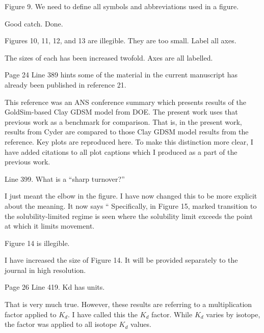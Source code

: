 \documentclass[answers,12pt]{exam}
\begin{document}
\begin{questions}
 

\question Figure 9. We need to define all symbols and abbreviations used in a figure.
\begin{solution}
Good catch. Done.
\end{solution}

 

\question Figures 10, 11, 12, and 13 are illegible. They are too small. Label all axes.
\begin{solution}
The sizes of each has been increased twofold. Axes are all labelled. 
\end{solution}

\question Page 24 Line 389 hints some of the material in the current manuscript has already been published in reference 21.
\begin{solution}
        This reference was an ANS conference summary which presents results of 
        the GoldSim-based Clay GDSM model from DOE. The present work uses that 
        previous work as a benchmark for comparison. That is, in the present 
        work, results from Cyder are compared to those Clay GDSM model results 
        from the reference. Key plots are reproduced here. To make this 
        distinction more clear, I have added citations to all plot captions 
        which I produced as a part of the previous work.
\end{solution}


\question Line 399. What is a ``sharp turnover?''
\begin{solution}
I just meant the elbow in the figure. I have now changed this to be more 
        explicit about the meaning. It now says `` Specifically, in Figure 15, 
        marked transition to the solubility-limited regime is seen where the 
        solubility limit exceeds the point at which it limits movement.  
\end{solution}

 

\question Figure 14 is illegible.
\begin{solution}
I have increased the size of Figure 14.
        It will be provided separately to the journal in high resolution. 

\end{solution}

 

\question Page 26 Line 419. Kd has units.
\begin{solution}
That is very much true. However, these results are referring to a 
        multiplication factor applied to $K_d$. I have called this the $K_d$ 
        factor. While $K_d$ varies by isotope, the factor was applied to all 
        isotope $K_d$ values. 
\end{solution}



\end{questions}
\end{document}
